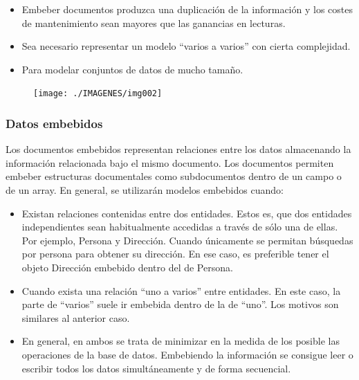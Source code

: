 \documentclass[preprint,12pt]{elsarticle}
\begin{document}
\begin{itemize}

\item Embeber documentos produzca una duplicación de la información y los costes de mantenimiento sean mayores que las ganancias en lecturas.
\item Sea necesario representar un modelo “varios a varios” con cierta complejidad.
\item Para modelar conjuntos de datos de mucho tamaño.

\end{itemize}

\begin{figure}[htb]
	\begin{center}
		\texttt{[image: ./IMAGENES/img002]} %
	\end{center}
\end{figure}



\subsubsection{\textbf{Datos embebidos}}
Los documentos embebidos representan relaciones entre los datos almacenando la información relacionada bajo el mismo documento. Los documentos permiten embeber estructuras documentales como subdocumentos dentro de un campo o de un array.
En general, se utilizarán modelos embebidos cuando:
\begin{itemize}

\item Existan relaciones contenidas entre dos entidades. Estos es, que dos entidades independientes sean habitualmente accedidas a través de sólo una de ellas. Por ejemplo, Persona y Dirección. Cuando únicamente se permitan búsquedas por persona para obtener su dirección. En ese caso, es preferible tener el objeto Dirección embebido dentro del de Persona.
\item Cuando exista una relación “uno a varios” entre entidades. En este caso, la parte de “varios” suele ir embebida dentro de la de “uno”. Los motivos son similares al anterior caso.
\item En general, en ambos se trata de minimizar en la medida de los posible las operaciones de la base de datos. Embebiendo la información se consigue leer o escribir todos los datos simultáneamente y de forma secuencial.

\end{itemize}
\end{document}
